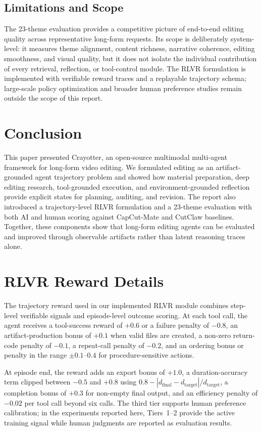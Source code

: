 ﻿\documentclass[11pt]{article}
\begin{document}
\subsection{Limitations and Scope}

The 23-theme evaluation provides a competitive picture of end-to-end editing
quality across representative long-form requests. Its scope is deliberately
system-level: it measures theme alignment, content richness, narrative
coherence, editing smoothness, and visual quality, but it does not isolate the
individual contribution of every retrieval, reflection, or tool-control module.
The RLVR formulation is implemented with verifiable reward traces and a
replayable trajectory schema; large-scale policy optimization and broader human
preference studies remain outside the scope of this report.

\section{Conclusion}

This paper presented Crayotter, an open-source multimodal multi-agent framework
for long-form video editing. We formulated editing as an artifact-grounded agent
trajectory problem and showed how material preparation, deep editing research,
tool-grounded execution, and environment-grounded reflection provide explicit
states for planning, auditing, and revision. The report also introduced a
trajectory-level RLVR formulation and a 23-theme evaluation with both AI and
human scoring against CapCut-Mate and CutClaw baselines. Together, these
components show that long-form editing agents can be evaluated and improved
through observable artifacts rather than latent reasoning traces alone.



\appendix

\section{RLVR Reward Details}
\label{app:rlvr_rewards}

The trajectory reward used in our implemented RLVR module combines step-level
verifiable signals and episode-level outcome scoring. At each tool call, the
agent receives a tool-success reward of $+0.6$ or a failure penalty of $-0.8$,
an artifact-production bonus of $+0.1$ when valid files are created, a non-zero
return-code penalty of $-0.1$, a repeat-call penalty of $-0.2$, and an ordering
bonus or penalty in the range $\pm0.1$--$0.4$ for procedure-sensitive actions.

At episode end, the reward adds an export bonus of $+1.0$, a duration-accuracy
term clipped between $-0.5$ and $+0.8$ using
$0.8-|d_{\text{final}}-d_{\text{target}}|/d_{\text{target}}$, a completion
bonus of $+0.3$ for non-empty final output, and an efficiency penalty of
$-0.02$ per tool call beyond six calls. The third tier supports human preference
calibration; in the experiments reported here, Tiers~1--2 provide the active
training signal while human judgments are reported as evaluation results.
\end{document}
